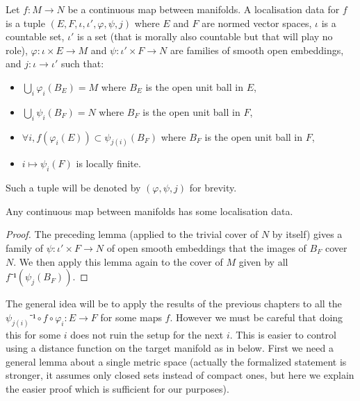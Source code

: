 \begin{definition}
  \label{def:localisation_data}
  \leanok
  Let $f : M → N$ be a continuous map between manifolds. A localisation data
  for $f$ is a tuple $(E, F, ι, ι', φ, ψ, j)$ where $E$ and $F$ are normed
  vector spaces, $ι$ is a countable set, $ι'$ is a set (that is
  morally also countable but that will play no role), $φ : ι × E → M$
  and $ψ : ι' × F → N$  are families of smooth open embeddings, and
  $j : ι → ι'$ such that:
  \begin{itemize}
    \item
      $⋃_i φ_i(B_E) = M$ where $B_E$ is the open unit ball in $E$,
      \item
      $⋃_i ψ_i(B_F) = N$ where $B_F$ is the open unit ball in $F$,
    \item
      $∀ i, f(φ_i(E)) ⊂ ψ_{j(i)}(B_F)$ where $B_F$ is the open unit ball in $F$,
    \item
      $i \mapsto ψ_i(F)$ is locally finite.
  \end{itemize}
  Such a tuple will be denoted by $(φ, ψ, j)$ for brevity.
\end{definition}

\begin{lemma}
  \label{lem:ex_localisation}
  \leanok
  Any continuous map between manifolds has some localisation data.
\end{lemma}

\begin{proof}
  \leanok
  The preceding lemma (applied to the trivial cover of $N$ by itself) gives a
  family of $ψ : ι' × F → N$ of open smooth embeddings that the images of
  $B_F$ cover $N$. We then apply this lemma again to the cover of $M$ given by all
  $f⁻¹(ψ_j(B_F))$.
\end{proof}

The general idea will be to apply the results of the previous chapters to
all the $ψ_{j(i)}⁻¹ ∘ f ∘ φ_i : E → F$ for some maps $f$. However we must be
careful that doing this for some $i$ does not ruin the setup for the next $i$.
This is easier to control using a distance function on the target manifold as
in  below. First we need a general lemma about
a single metric space (actually the formalized statement is stronger, it assumes
only closed sets instead of compact ones, but here we explain the easier proof
which is sufficient for our purposes).

